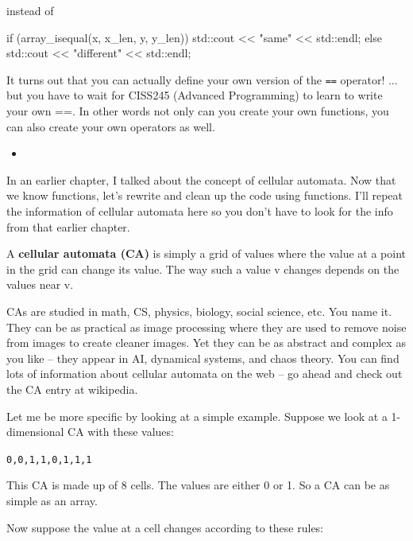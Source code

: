 instead of

\begin{consolethree}[escapeinside=||]
if (array_isequal(x, x_len, y, y_len))
{
    std::cout << "same" << std::endl;
}
else
{
    std::cout << "different" << std::endl;
}
\end{consolethree}

It turns out that you can actually define your own version of the \texttt{==} operator! ... but you have to wait for CISS245 (Advanced Programming) to learn to write your own ==. In other words not only can you create your own functions, you can also create your own operators as well.

\begin{itemize}

\item
\end{itemize}


\newpage{}

In an earlier chapter, I talked about the concept of cellular automata.
Now that we know functions, let's rewrite and clean up the code using
functions. I'll repeat the information of cellular automata here so you
don't have to look for the info from that earlier chapter.

A \textbf{cellular automata (CA)} is simply a grid of values where the
value at a point in the grid can change its value. The way such a value
v changes depends on the values near v.

CAs are studied in math, CS, physics, biology, social science, etc. You
name it. They can be as practical as image processing where they are
used to remove noise from images to create cleaner images. Yet they can
be as abstract and complex as you like -- they appear in AI, dynamical
systems, and chaos theory. You can find lots of information about
cellular automata on the web -- go ahead and check out the CA entry at
wikipedia.

Let me be more specific by looking at a simple example. Suppose we look at a 1-dimensional CA with these values:
\begin{center}
\texttt{0,0,1,1,0,1,1,1}
\end{center}
This CA is made up of 8 cells. The values are either 0 or 1. So a CA can be as simple as an array.

Now suppose the value at a cell changes according to these rules:

